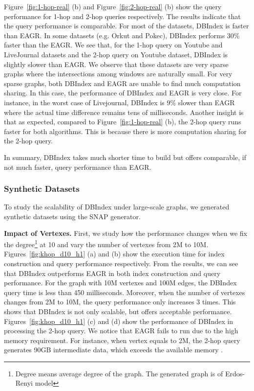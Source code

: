 Figure~\ref{fig:1-hop-real} (b) and Figure~\ref{fig:2-hop-real} (b) 
show the query performance for 1-hop and 2-hop queries respectively. 
The results indicate that the query performance is comparable. 
For most of the datasets, DBIndex is faster than EAGR.
In some datasets (e.g. Orkut and Pokec), DBIndex performs 30\% faster than the EAGR. 
We see that, for the 1-hop query on 
Youtube and LiveJournal datasets and the 2-hop query 
on Youtube dataset, DBIndex is slightly slower than EAGR. We observe 
that these datasets are very sparse graphs where the intersections among windows are naturally small. For very sparse graphs, 
both DBIndex and EAGR are unable to find much computation sharing. In this case, the performance of DBIndex and EAGR is very close. For instance, in the worst case of Livejournal, DBIndex is 9\% slower than EAGR where the actual time difference remains tens of milliseconds.    
%
Another insight is that as expected, compared to Figure~\ref{fig:1-hop-real} (b), 
the 2-hop query runs faster for both algorithms. This is because there is more computation sharing for the 2-hop query. 

In summary, 
DBIndex takes much shorter time to build but offers comparable, if not much faster, query 
performance than EAGR.


\subsubsection{Synthetic Datasets}
To study the scalability of DBIndex under large-scale graphs, 
we generated synthetic datasets using the SNAP generator. 


\textbf{Impact of Vertexes.} First, we study how the performance 
changes when we fix the degree\footnote{Degree means average degree of the graph. The generated graph is of Erdos-Renyi model } at 10 and vary the number of vertexes from 
2M to 10M. Figures~\ref{fig:khop_d10_h1} (a) and (b) show the execution time for index construction and query performance respectively. 
From the results, we can see that DBIndex outperforms EAGR in
both index construction and query performance. For the graph with 10M vertexes and 100M edges, the DBIndex query time is less than 450 milliseconds. 
Moreover, when the number of vertexes changes from 2M to 10M, 
the query performance only increases 3 times. This shows that
DBIndex is not only scalable, but offers acceptable performance. Figures~\ref{fig:khop_d10_h1} (c) and (d) show the
performance of DBIndex in processing the 2-hop query. We notice that EAGR fails to run due to the high memory requirement. For instance, when vertex equals to 2M, the 2-hop query generates 90GB intermediate data, which exceeds the available memory
.

